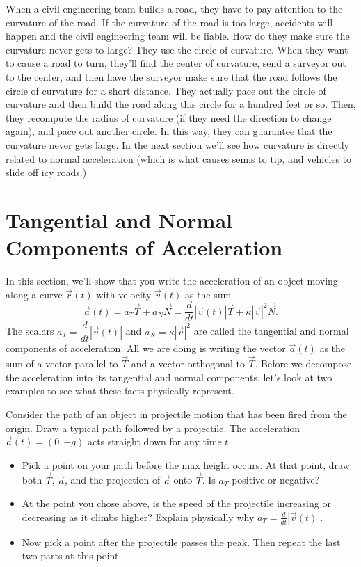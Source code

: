 When a civil engineering team builds a road, they have to pay attention to the curvature of the road.  If the curvature of the road is too large, accidents will happen and the civil engineering team will be liable. How do they make sure the curvature never gets to large?  They use the circle of curvature. When they want to cause a road to turn, they'll find the center of curvature, send a surveyor out to the center, and then have the surveyor make sure that the road follows the circle of curvature for a short distance. They actually pace out the circle of curvature and then build the road along this circle for a hundred feet or so.  Then, they recompute the radius of curvature (if they need the direction to change again), and pace out another circle.  In this way, they can guarantee that the curvature never gets large. In the next section we'll see how curvature is directly related to normal acceleration (which is what causes semis to tip, and vehicles to slide off icy roads.)

\section{Tangential and Normal Components of Acceleration}

In this section, we'll show that you write the acceleration of an object moving along a curve $\vec r(t)$ with velocity $\vec v(t)$ as the sum
$$\vec a(t) = a_T\vec T+a_N\vec N=\frac{d}{dt}|\vec v(t)| \vec T + \kappa |\vec v|^2 \vec N.$$
The scalars $a_T=\dfrac{d}{dt}|\vec v(t)|$ and $a_N=\kappa |\vec v|^2$ 
are called the tangential and normal components of acceleration.  All we are doing is writing the vector $\vec a(t)$ as the sum of a vector parallel to $\vec T$ and a vector orthogonal to $\vec T$. Before we decompose the acceleration into its tangential and normal components, let's look at two examples to see what these facts physically represent.

\begin{problem}
 Consider the path of an object in projectile motion that has been fired from the origin. Draw a typical path followed by a projectile.  The acceleration $\vec a(t)=(0,-g)$ acts straight down for any time $t$.  
\begin{itemize}
 \item Pick a point on your path before the max height occurs. At that point, draw both $\vec T$, $\vec a$, and the projection of $\vec a$ onto $\vec T$.  Is $a_T$ positive or negative? 
 \item At the point you chose above, is the speed of the projectile increasing or decreasing as it climbs higher? Explain physically why $a_T = \frac{d}{dt}|\vec v(t)|$.
 \item Now pick a point after the projectile passes the peak.  Then repeat the last two parts at this point.
\end{itemize}
\end{problem}

